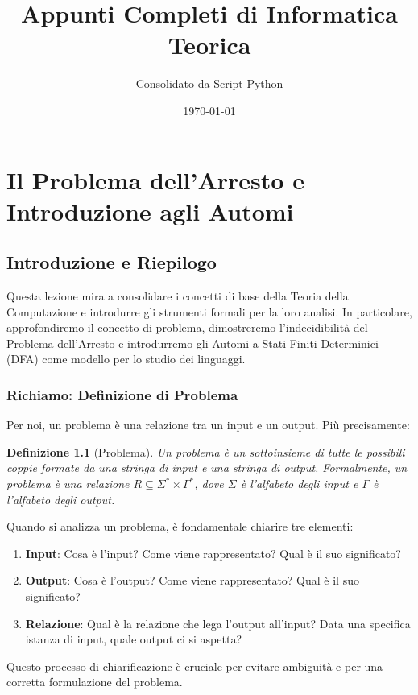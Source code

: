 \documentclass[a4paper, 11pt]{book} %
\title{Appunti Completi di Informatica Teorica}
\author{Consolidato da Script Python}
\date{\today}
\newtheorem{definition}[theorem]{Definizione}
\theoremstyle{definition}
\begin{document}
\frontmatter
\maketitle
\tableofcontents
\mainmatter


\chapter{Il Problema dell'Arresto e Introduzione agli Automi}



\section{Introduzione e Riepilogo}

Questa lezione mira a consolidare i concetti di base della Teoria della Computazione e introdurre gli strumenti formali per la loro analisi. In particolare, approfondiremo il concetto di problema, dimostreremo l'indecidibilità del Problema dell'Arresto e introdurremo gli Automi a Stati Finiti Determinici (DFA) come modello per lo studio dei linguaggi.

\subsection{Richiamo: Definizione di Problema}

Per noi, un problema è una relazione tra un input e un output. Più precisamente:

\begin{definition}[Problema]
Un problema è un sottoinsieme di tutte le possibili coppie formate da una stringa di input e una stringa di output.
Formalmente, un problema è una relazione $R \subseteq \Sigma^* \times \Gamma^*$, dove $\Sigma$ è l'alfabeto degli input e $\Gamma$ è l'alfabeto degli output.
\end{definition}

Quando si analizza un problema, è fondamentale chiarire tre elementi:
\begin{enumerate}
    \item \textbf{Input}: Cosa è l'input? Come viene rappresentato? Qual è il suo significato?
    \item \textbf{Output}: Cosa è l'output? Come viene rappresentato? Qual è il suo significato?
    \item \textbf{Relazione}: Qual è la relazione che lega l'output all'input? Data una specifica istanza di input, quale output ci si aspetta?
\end{enumerate}
Questo processo di chiarificazione è cruciale per evitare ambiguità e per una corretta formulazione del problema.
\end{document}
